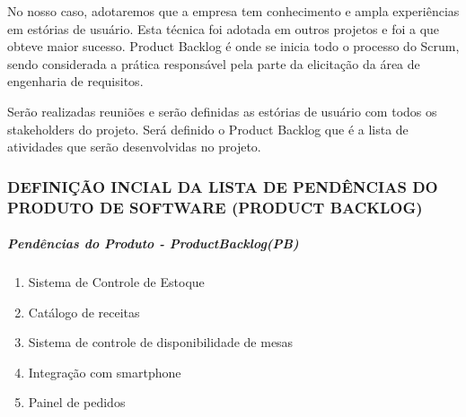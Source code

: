 No nosso caso, adotaremos que a empresa tem conhecimento e ampla experiências em estórias de usuário. Esta técnica foi adotada em outros projetos e foi a que obteve maior sucesso. Product Backlog é onde se inicia todo o processo do Scrum, sendo considerada a prática responsável pela parte da elicitação da área de engenharia de requisitos.

Serão realizadas reuniões e serão definidas as estórias de usuário com todos os stakeholders do projeto. Será definido o Product Backlog que é a lista de atividades que serão desenvolvidas no projeto.


\subsubsection{DEFINIÇÃO INCIAL DA LISTA DE PENDÊNCIAS DO PRODUTO DE SOFTWARE (PRODUCT BACKLOG)
}

\subparagraph{Pendências do Produto - ProductBacklog(PB)}

\begin{enumerate}
  \item Sistema de Controle de Estoque
  \item Catálogo de receitas
  \item Sistema de controle de disponibilidade de mesas
  \item Integração com smartphone
  \item Painel de pedidos
\end{enumerate}

